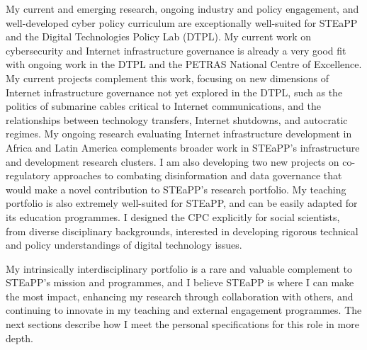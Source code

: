 \documentclass[11pt]{letter}
\begin{document}
\begin{letter}
My current and emerging research, ongoing industry and policy engagement, and well-developed cyber policy curriculum are exceptionally well-suited for STEaPP and the Digital Technologies Policy Lab (DTPL).
%
My current work on cybersecurity and Internet infrastructure governance is already a very good fit with ongoing work in the DTPL and the PETRAS National Centre of Excellence. 
%
My current projects complement this work, focusing on new dimensions of Internet infrastructure governance not yet explored in the DTPL, such as the politics of submarine cables critical to Internet communications, and the relationships between technology transfers, Internet shutdowns, and autocratic regimes. 
%
My ongoing research evaluating Internet infrastructure development in Africa and Latin America complements broader work in STEaPP’s infrastructure and development research clusters.
%
I am also developing two new projects on co-regulatory approaches to combating disinformation and data governance that would make a novel contribution to STEaPP’s research portfolio. 
%
My teaching portfolio is also extremely well-suited for STEaPP, and can be easily adapted for its education programmes.
%
%
I designed the CPC explicitly for social scientists, from diverse disciplinary backgrounds, interested in developing rigorous technical and policy understandings of digital technology issues.
%
%
%

My intrinsically interdisciplinary portfolio is a rare and valuable complement to STEaPP's mission and programmes, and I believe STEaPP is where I can make the most impact, enhancing my research through collaboration with others, and continuing to innovate in my teaching and external engagement programmes.
%
The next sections describe how I meet the personal specifications for this role in more depth. 





\end{letter}
\end{document}
